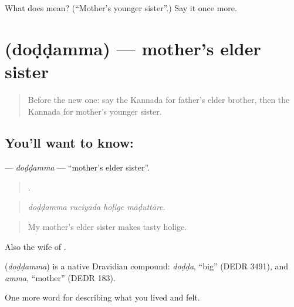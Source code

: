 \begin{tcolorbox}[breakable,colback=teal!4,colframe=teal!35!black,title={Before you move on}]
What does  mean? (\textquotedblleft{}Mother's younger sister\textquotedblright{}.) Say it once more.
\end{tcolorbox}
\section[\texorpdfstring{\kn{ದೊಡ್ಡಮ್ಮ} (doḍḍamma)}{ದೊಡ್ಡಮ್ಮ (doḍḍamma)}]{ (doḍḍamma) — mother's elder sister}

\label{lesson:KA-C524-doddamma}



\begin{quote}
Before the new one: say the Kannada for father's elder brother, then the Kannada for mother's younger sister.
\end{quote}

\subsection*{You'll want to know: }
\textbf{} — \emph{doḍḍamma} — \textquotedblleft{}mother's elder sister\textquotedblright{}.

\begin{quote}
   .
\end{quote}

\begin{quote}
\emph{doḍḍamma ruciyāda hōḷige māḍuttāre.}
\end{quote}

\begin{quote}
My mother's elder sister makes tasty holige.
\end{quote}

Also the wife of .

\begin{cousinweb}
\textbf{} (\emph{doḍḍamma}) is a native Dravidian compound: \emph{doḍḍa}, \textquotedblleft{}big\textquotedblright{} (DEDR 3491), and \emph{amma}, \textquotedblleft{}mother\textquotedblright{} (DEDR 183).
\end{cousinweb}

\begin{grammarlens}[title={What you've built}]
One more word for describing what you lived and felt.
\end{grammarlens}

